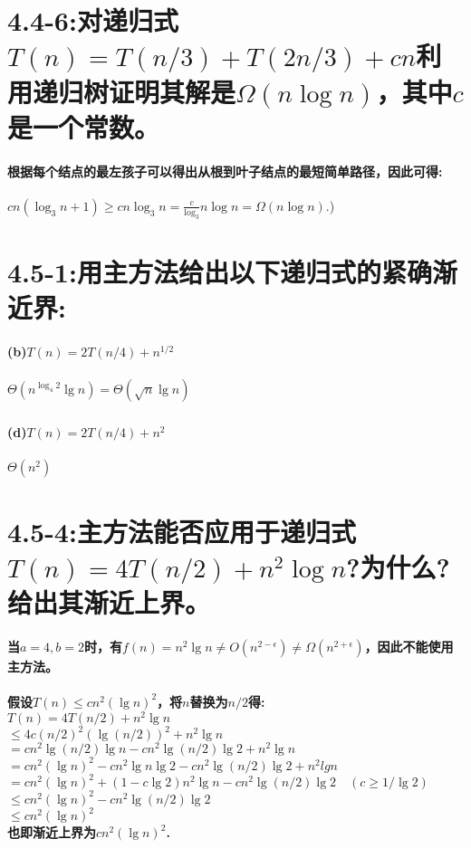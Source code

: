 \documentclass[a4paper]{article}
\begin{document}
\section{4.4-6:对递归式$T(n)=T(n/3)+T(2n/3)+cn$利用递归树证明其解是$\Omega(n\log n)$，其中$c$是一个常数。}
\paragraph{根据每个结点的最左孩子可以得出从根到叶子结点的最短简单路径，因此可得:}
\begin{center}
    $cn(\log _{3}n+1)\geq cn\log _{3}n=\frac{c}{\log _{3}}n\log n=\Omega(n\log n).$)
\end{center}
\section{4.5-1:用主方法给出以下递归式的紧确渐近界:}
\paragraph{(b)$T(n)=2T(n/4)+n^{1/2}$}
\subparagraph{$\Theta(n^{\log _{4}2}\lg n)=\Theta(\sqrt{n}\lg n)$}
\paragraph{(d)$T(n)=2T(n/4)+n^2$}
\subparagraph{$\Theta(n^2)$}
\section{4.5-4:主方法能否应用于递归式$T(n)=4T(n/2)+n^2\log n$?为什么?给出其渐近上界。}
\paragraph{当$a=4,b=2$时，有$f(n)=n^2\lg n \neq O(n^{2-\epsilon}) \neq \Omega(n^{2+\epsilon})$，因此不能使用主方法。}
\paragraph{
    假设$T(n)\leq cn^2(\lg n)^2$，将$n$替换为$n/2$得:\\
    $T(n)=4T(n/2)+n^2\lg n$\\
    $\leq 4c(n/2)^2(\lg(n/2))^2+n^2\lg n$\\
    $=cn^2\lg (n/2)\lg n-cn^2\lg (n/2)\lg 2+n^2\lg n$\\
    $=cn^2(\lg n)^2-cn^2\lg n\lg 2-cn^2\lg (n/2) \lg 2 +n^2 lg n$\\
    $=cn^2(\lg n)^2+(1-c\lg 2)n^2\lg n-cn^2\lg (n/2)\lg 2\quad(c\geq 1/\lg 2)$\\
    $\leq cn^2(\lg n)^2-cn^2\lg(n/2)\lg 2$\\
    $\leq cn^2(\lg n)^2$\\
    也即渐近上界为$cn^2(\lg n)^2$.
}
\end{document}
